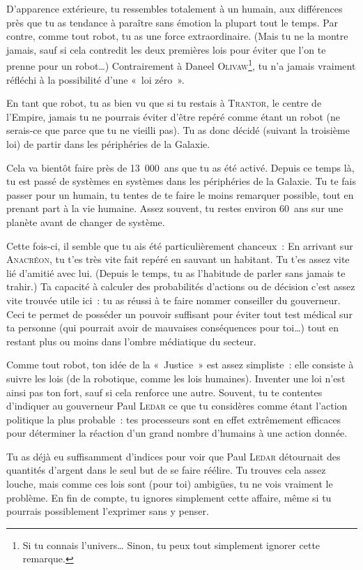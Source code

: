 {D’apparence extérieure, tu ressembles totalement à un humain, aux différences près que tu as tendance à paraître sans émotion la plupart tout le temps.
Par contre, comme tout robot, tu as une force extraordinaire.  (Mais tu ne la montre jamais, sauf si cela contredit les deux premières lois pour éviter que l’on te prenne pour un robot…)
Contrairement à Daneel \textsc{Olivaw}\footnote{Si tu connais l’univers…  Sinon, tu peux tout simplement ignorer cette remarque.}, tu n’a jamais vraiment réfléchi à la possibilité d’une «~loi zéro~».

En tant que robot, tu as bien vu que si tu restais à \textsc{Trantor}, le centre de l’Empire, jamais tu ne pourrais éviter d’être repéré comme étant un robot (ne serais-ce que parce que tu ne vieilli pas).
Tu as donc décidé (suivant la troisième loi) de partir dans les périphéries de la Galaxie.

Cela va bientôt faire près de 13~000~ans que tu as été activé.
Depuis ce temps là, tu est passé de systèmes en systèmes dans les périphéries de la Galaxie.
Tu te fais passer pour un humain, tu tentes de te faire le moins remarquer possible, tout en prenant part à la vie humaine.
Assez souvent, tu restes environ 60~ans sur une planète avant de changer de système.

Cette fois-ci, il semble que tu ais été particulièrement chanceux~:
En arrivant sur \textsc{Anacréon}, tu t’es très vite fait repéré en sauvant un habitant.
Tu t’es assez vite lié d’amitié avec lui.  (Depuis le temps, tu as l’habitude de parler sans jamais te trahir.)
Ta capacité à calculer des probabilités d’actions ou de décision c’est assez vite trouvée utile ici~:  tu as réussi à te faire nommer conseiller du gouverneur.
Ceci te permet de posséder un pouvoir suffisant pour éviter tout test médical sur ta personne (qui pourrait avoir de mauvaises conséquences pour toi…) tout en restant plus ou moins dans l’ombre médiatique du secteur.

Comme tout robot, ton idée de la «~Justice~» est assez simpliste~:  elle consiste à suivre les lois (de la robotique, comme les lois humaines).
Inventer une loi n’est ainsi pas ton fort, sauf si cela renforce une autre.
Souvent, tu te contentes d’indiquer au gouverneur Paul \textsc{Ledar} ce que tu considères comme étant l’action politique la plus probable~:  tes processeurs sont en effet extrêmement efficaces pour déterminer la réaction d’un grand nombre d’humains à une action donnée.

Tu as déjà eu suffisamment d’indices pour voir que Paul \textsc{Ledar} détournait des quantités d’argent dans le seul but de se faire réélire.
Tu trouves cela assez louche, mais comme ces lois sont (pour toi) ambigües, tu ne vois vraiment le problème.
En fin de compte, tu ignores simplement cette affaire, même si tu pourrais possiblement l’exprimer sans y penser.

}
